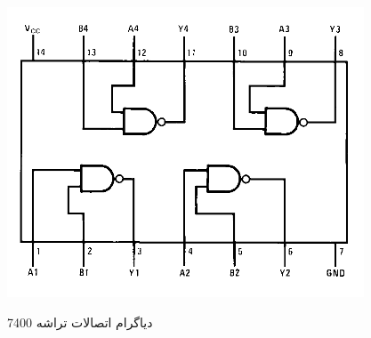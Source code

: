 \documentclass[twoside]{article}
\begin{document}
\begin{itemize}
	\begin{figure}[h!]
		\begin{center}
			\includegraphics[scale=0.75]{DM74SL00_connection_diagram}‎
			\caption{دیاگرام اتصالات تراشه 7400}
		\end{center}
	\end{figure} 
	
	\end{itemize}
	
\end{document}
